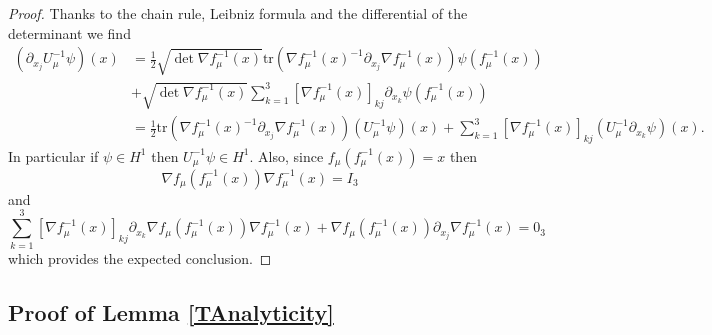 \documentclass[a4paper, 12pt]{amsart}
\numberwithin{equation}{section}
\newcommand{\tr}{\mathrm{tr}} %
\newcommand{\lp}{\left(} %
\newcommand{\rp}{\right)} %
\newcommand{\lv}{\left\vert} %
\newcommand{\rv}{\right\vert} %
\newcommand{\evec}{\mathbf{e}}
\begin{document}
\begin{proof}
    Thanks to the chain rule, Leibniz formula and the differential of the determinant we find
    \begin{align*}
        \lp\partial_{x_j} U_\mu^{-1}\psi\rp(x)
        &=\frac{1}{2}\sqrt{\det \nabla f_\mu^{-1}(x)}\tr\lp \nabla f_\mu^{-1}(x)^{-1}\partial_{x_j}\nabla f_\mu^{-1}(x)\rp\psi(f_\mu^{-1}(x))\\
        &+\sqrt{\det \nabla f_\mu^{-1}(x)}\sum_{k=1}^3[\nabla f_\mu^{-1}(x)]_{kj}\partial_{x_k}\psi(f_\mu^{-1}(x))\\
        &=\frac{1}{2}\tr\lp \nabla f_\mu^{-1}(x)^{-1}\partial_{x_j}\nabla f_\mu^{-1}(x)\rp \lp U_\mu^{-1}\psi\rp(x)+\sum_{k=1}^3[\nabla f_\mu^{-1}(x)]_{kj}\lp U_\mu^{-1}\partial_{x_k}\psi\rp(x).
    \end{align*}
    In particular if $\psi\in H^1$ then $U_\mu^{-1}\psi\in H^1$. Also, since $f_\mu(f_\mu^{-1}(x))= x$ then 
    \begin{equation*}
        \nabla f_\mu(f_\mu^{-1}(x))\nabla f_\mu^{-1}(x)=I_3
    \end{equation*} and
    \[\sum_{k=1}^3[\nabla f_\mu^{-1}(x)]_{kj}\partial_{x_k}\nabla f_\mu(f_\mu^{-1}(x))\nabla f_\mu^{-1}(x)+\nabla f_\mu(f_\mu^{-1}(x))\partial_{x_j}\nabla f_\mu^{-1}(x)=0_3\]
    which provides the expected conclusion. 
    
\end{proof}

\subsection{Proof of Lemma \ref{TAnalyticity}}
\end{document}
